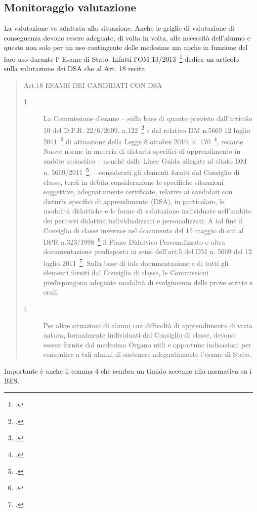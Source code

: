 \subsection{Monitoraggio valutazione}
 La valutazione va adattata alla situazione. Anche le griglie di valutazione di conseguenza devono essere adeguate, di volta in volta, alle necessità dell'alunno e questo non solo per un uso contingente delle medesime ma anche in funzione del loro uso durante l' Esame di Stato. Infatti l'OM 13/2013~\footcite{OM_13_13} dedica un articolo sulla valutazione dei DSA che al Art. 18 recita
\begin{quote}
	Art.18 ESAME DEI CANDIDATI CON DSA
	\begin{description}
		\item[1] La Commissione d'esame – sulla base di quanto previsto dall'articolo 10 del D.P.R. 22/6/2009, n.122~\footcite{DPR_122_2009} e dal relativo DM n.5669 12 luglio 2011~\footcite{decreto5669_2011} di attuazione della Legge 8 ottobre 2010, n. 170~\footcite{legge170}, recante Nuove norme in materia di disturbi specifici di apprendimento in ambito scolastico – nonché dalle Linee Guida allegate al citato DM n. 5669/2011~\footcite{decreto5669_2011}, – considerati gli elementi forniti dal Consiglio di classe, terrà in debita considerazione le specifiche situazioni soggettive, adeguatamente certificate, relative ai candidati con disturbi specifici di apprendimento (DSA), in particolare, le modalità didattiche e le forme di valutazione individuate nell'ambito dei percorsi didattici individualizzati e personalizzati. A tal fine il Consiglio di classe inserisce nel documento del 15 maggio di cui al DPR n.323/1998~\footcite{DPR_323_1998} il Piano Didattico Personalizzato o altra documentazione predisposta ai sensi dell'art.5 del DM n. 5669 del 12 luglio 2011~\footcite{decreto5669_2011}. Sulla base di tale documentazione e di tutti gli elementi forniti dal Consiglio di classe, le Commissioni predispongono adeguate modalità di svolgimento delle prove scritte e orali. 
		\mancatesto
		\item[4]Per altre situazioni di alunni con difficoltà di apprendimento di varia natura, formalmente individuati dal Consiglio di classe, devono essere fornite dal medesimo Organo utili e opportune indicazioni per consentire a tali alunni di sostenere adeguatamente l'esame di Stato.
	\end{description}
\end{quote}
Importante è anche il comma 4 che sembra un timido accenno alla normativa su i BES.